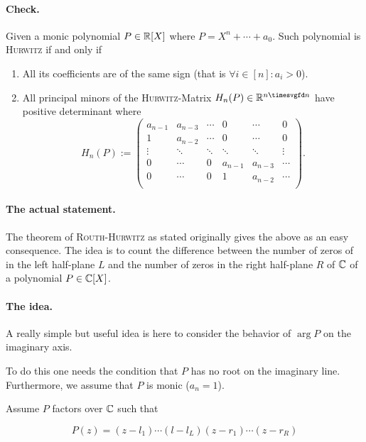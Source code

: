 \message{ !name(On The Routh-Hurwitz Theorem.tex)}\documentclass[10pt,a4paper]{article}
\begin{document}
\paragraph{Check.} Given a monic polynomial $P\in\mathbb{R}[X]$ where $P=X^n+\cdots+a_0$. Such polynomial is \textsc{Hurwitz} if and only if 
\begin{enumerate}
\item All its coefficients are of the same sign (that is $\forall i\in[n] : a_i>0$).
\item All principal minors of the \textsc{Hurwitz}-Matrix $H_n(P)\in\reels^{n\timesvgfd n}$ have positive determinant where
\begin{equation}
H_n(P) := \begin{pmatrix}
a_{n-1} & a_{n-3} & \cdots & 0 & \cdots & 0\\
1 		 & a_{n-2} & \cdots & 0 & \cdots & 0\\
\vdots & \ddots & \ddots & \ddots & \ddots & \vdots\\
0 & \cdots & 0 & a_{n-1} & a_{n-3} & \cdots\\
0 & \cdots & 0 & 1 		 & a_{n-2} & \cdots\\
\end{pmatrix}\text{.}
\end{equation}
\end{enumerate}

\paragraph{The actual statement.} The theorem of \textsc{Routh-Hurwitz} as stated originally gives the above as an easy consequence. The idea is to count the difference between the number of zeros of in the left half-plane $L$ and the number of zeros in the right half-plane $R$ of $\mathbb{C}$ of a polynomial $P\in\mathbb{C}[X]$. 

\paragraph{The idea.}
A really simple but useful idea is here to consider the behavior of $\arg{P}$ on the imaginary axis.

To do this one needs the condition that $P$ has no root on the imaginary line. Furthermore, we assume that $P$ is monic ($a_n=1$).

Assume $P$ factors over $\mathbb{C}$ such that 

\begin{equation}
P(z)=(z-l_1)\cdots(l-l_L)(z-r_1)\cdots(z-r_R)
\end{equation}
\end{document}
